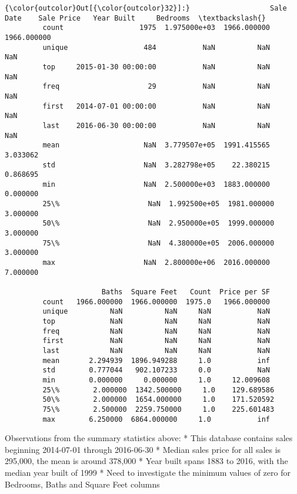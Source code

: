 \documentclass[11pt]{article}
\begin{document}
\begin{Verbatim}[commandchars=\\\{\}]
{\color{outcolor}Out[{\color{outcolor}32}]:}                   Sale Date    Sale Price   Year Built     Bedrooms  \textbackslash{}
         count                  1975  1.975000e+03  1966.000000  1966.000000   
         unique                  484           NaN          NaN          NaN   
         top     2015-01-30 00:00:00           NaN          NaN          NaN   
         freq                     29           NaN          NaN          NaN   
         first   2014-07-01 00:00:00           NaN          NaN          NaN   
         last    2016-06-30 00:00:00           NaN          NaN          NaN   
         mean                    NaN  3.779507e+05  1991.415565     3.033062   
         std                     NaN  3.282798e+05    22.380215     0.868695   
         min                     NaN  2.500000e+03  1883.000000     0.000000   
         25\%                     NaN  1.992500e+05  1981.000000     3.000000   
         50\%                     NaN  2.950000e+05  1999.000000     3.000000   
         75\%                     NaN  4.380000e+05  2006.000000     3.000000   
         max                     NaN  2.800000e+06  2016.000000     7.000000   
         
                       Baths  Square Feet   Count  Price per SF  
         count   1966.000000  1966.000000  1975.0   1966.000000  
         unique          NaN          NaN     NaN           NaN  
         top             NaN          NaN     NaN           NaN  
         freq            NaN          NaN     NaN           NaN  
         first           NaN          NaN     NaN           NaN  
         last            NaN          NaN     NaN           NaN  
         mean       2.294939  1896.949288     1.0           inf  
         std        0.777044   902.107233     0.0           NaN  
         min        0.000000     0.000000     1.0     12.009608  
         25\%        2.000000  1342.500000     1.0    129.689586  
         50\%        2.000000  1654.000000     1.0    171.520592  
         75\%        2.500000  2259.750000     1.0    225.601483  
         max        6.250000  6864.000000     1.0           inf  
\end{Verbatim}
            
    Observations from the summary statistics above: * This database contains
sales beginning 2014-07-01 through 2016-06-30 * Median sales price for
all sales is 295,000, the mean is around 378,000 * Year built spans 1883
to 2016, with the median year built of 1999 * Need to investigate the
minimum values of zero for Bedrooms, Baths and Square Feet columns
\end{document}
